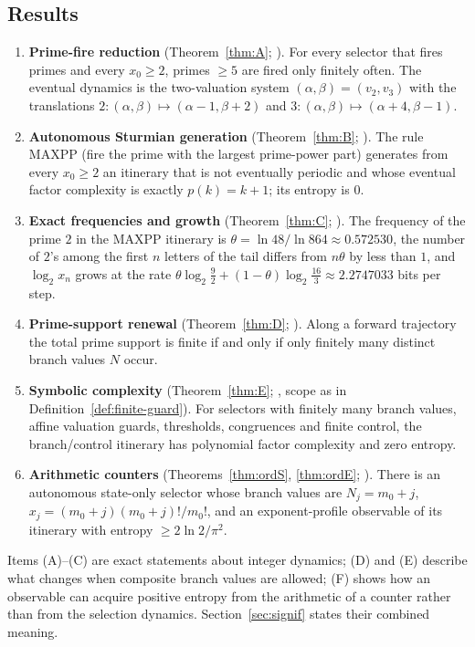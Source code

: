 \subsection{Results}
\begin{theorem}[Summary]\label{thm:summary}
\begin{enumerate}[label=(\Alph*),itemsep=2pt]
\item \textbf{Prime-fire reduction} (Theorem~\ref{thm:A}; \cite{u4gen}). For every selector that fires primes and every $x_0\ge2$, primes $\ge5$ are fired only finitely often. The eventual dynamics is the two-valuation system $(\alpha,\beta)=(v_2,v_3)$ with the translations $2:(\alpha,\beta)\mapsto(\alpha-1,\beta+2)$ and $3:(\alpha,\beta)\mapsto(\alpha+4,\beta-1)$.
\item \textbf{Autonomous Sturmian generation} (Theorem~\ref{thm:B}; \cite{u4gen}). The rule \textsf{MAXPP} (fire the prime with the largest prime-power part) generates from every $x_0\ge2$ an itinerary that is not eventually periodic and whose eventual factor complexity is exactly $p(k)=k+1$; its entropy is $0$.
\item \textbf{Exact frequencies and growth} (Theorem~\ref{thm:C}; \cite{u4genc}). The frequency of the prime $2$ in the \textsf{MAXPP} itinerary is $\theta=\ln48/\ln864\approx0.572530$, the number of $2$'s among the first $n$ letters of the tail differs from $n\theta$ by less than $1$, and $\log_2x_n$ grows at the rate $\theta\log_2\tfrac92+(1-\theta)\log_2\tfrac{16}3\approx2.2747033$ bits per step.
\item \textbf{Prime-support renewal} (Theorem~\ref{thm:D}; \cite{u4genc}). Along a forward trajectory the total prime support is finite if and only if only finitely many distinct branch values $N$ occur.
\item \textbf{Symbolic complexity} (Theorem~\ref{thm:E}; \cite{u4genc}, scope as in Definition~\ref{def:finite-guard}). For selectors with finitely many branch values, affine valuation guards, thresholds, congruences and finite control, the branch/control itinerary has polynomial factor complexity and zero entropy.
\item \textbf{Arithmetic counters} (Theorems~\ref{thm:ordS}, \ref{thm:ordE}; \cite{u4order}). There is an autonomous state-only selector whose branch values are $N_j=m_0+j$, $x_j=(m_0+j)(m_0+j)!/m_0!$, and an exponent-profile observable of its itinerary with entropy $\ge2\ln2/\pi^2$.
\end{enumerate}
\end{theorem}
Items (A)--(C) are exact statements about integer dynamics; (D) and (E) describe what changes when composite branch values are allowed; (F) shows how an observable can acquire positive entropy from the arithmetic of a counter rather than from the selection dynamics.
Section~\ref{sec:signif} states their combined meaning.

